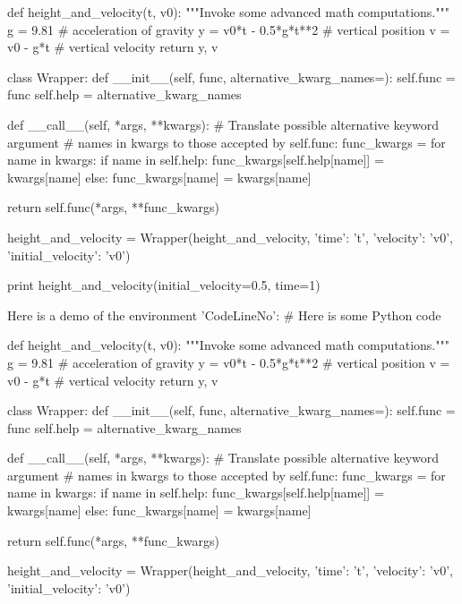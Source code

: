 def height_and_velocity(t, v0):
    """Invoke some advanced math computations."""
    g = 9.81                  # acceleration of gravity
    y = v0*t - 0.5*g*t**2     # vertical position
    v = v0 - g*t              # vertical velocity
    return y, v

class Wrapper:
    def __init__(self, func, alternative_kwarg_names={}):
        self.func = func
        self.help = alternative_kwarg_names

    def __call__(self, *args, **kwargs):
        # Translate possible alternative keyword argument
        # names in kwargs to those accepted by self.func:
        func_kwargs = {}
        for name in kwargs:
            if name in self.help:
                func_kwargs[self.help[name]] = kwargs[name]
            else:
                func_kwargs[name] = kwargs[name]

        return self.func(*args, **func_kwargs)

height_and_velocity = Wrapper(height_and_velocity,
                              {'time': 't',
                               'velocity': 'v0',
                               'initial_velocity': 'v0'})

print height_and_velocity(initial_velocity=0.5, time=1)


\noindent
Here is a demo of the environment 'CodeLineNo':
# Here is some Python code

def height_and_velocity(t, v0):
    """Invoke some advanced math computations."""
    g = 9.81                  # acceleration of gravity
    y = v0*t - 0.5*g*t**2     # vertical position
    v = v0 - g*t              # vertical velocity
    return y, v

class Wrapper:
    def __init__(self, func, alternative_kwarg_names={}):
        self.func = func
        self.help = alternative_kwarg_names

    def __call__(self, *args, **kwargs):
        # Translate possible alternative keyword argument
        # names in kwargs to those accepted by self.func:
        func_kwargs = {}
        for name in kwargs:
            if name in self.help:
                func_kwargs[self.help[name]] = kwargs[name]
            else:
                func_kwargs[name] = kwargs[name]

        return self.func(*args, **func_kwargs)

height_and_velocity = Wrapper(height_and_velocity,
                              {'time': 't',
                               'velocity': 'v0',
                               'initial_velocity': 'v0'})

